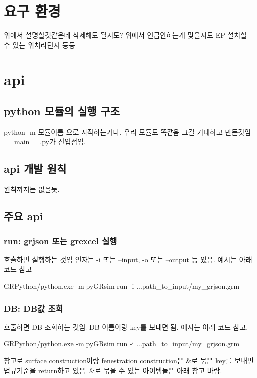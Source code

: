 \section{요구 환경}
위에서 설명할것같은데 삭제해도 될지도? 위에서 언급안하는게 맞을지도 EP 설치할 수 있는 위치라던지 등등


\section{api}
\subsection{python 모듈의 실행 구조}
python -m 모듈이름 으로 시작하는거다. 우리 모듈도 똑같음 그걸 기대하고 만든것임 \_\_main\_\_.py가 진입점임.

\subsection{api 개발 원칙}
원칙까지는 없을듯.

\subsection{주요 api}

\subsubsection{run: grjson 또는 grexcel 실행}
호출하면 실행하는 것임 인자는 -i 또는 --input, -o 또는 --output 등 있음. 예시는 아래 코드 참고
\begin{tcolorbox}[colback=gray!10, colframe=gray!80, boxrule=0.5pt, left=1em, right=1em]
GRPython/python.exe -m pyGRsim run -i ...path\_to\_input/my\_grjson.grm
\end{tcolorbox}

\subsubsection{DB: DB값 조회}
호출하면 DB 조회하는 것임. DB 이름이랑 key를 보내면 됨. 예시는 아래 코드 참고.

\begin{tcolorbox}[colback=gray!10, colframe=gray!80, boxrule=0.5pt, left=1em, right=1em]
GRPython/python.exe -m pyGRsim run -i ...path\_to\_input/my\_grjson.grm
\end{tcolorbox}

참고로 surface construction이랑 fenestration construction은 \&로 묶은 key를 보내면 법규기준을 return하고 있음. \&로 묶을 수 있는 아이템들은 아래 참고 바람.